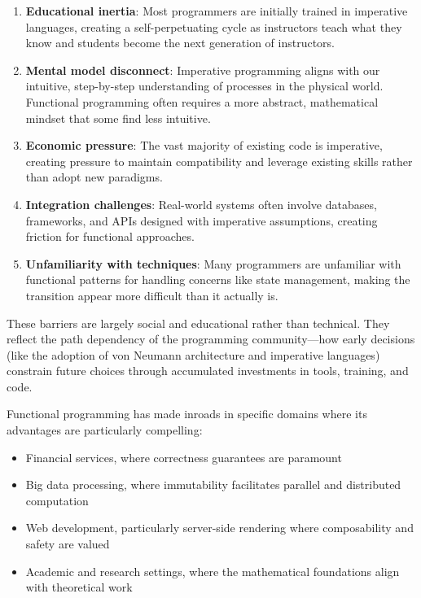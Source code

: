 \documentclass[11pt]{article}
\begin{document}
\begin{enumerate}
\item \textbf{Educational inertia}: Most programmers are initially trained in imperative languages, creating a self-perpetuating cycle as instructors teach what they know and students become the next generation of instructors.

\item \textbf{Mental model disconnect}: Imperative programming aligns with our intuitive, step-by-step understanding of processes in the physical world. Functional programming often requires a more abstract, mathematical mindset that some find less intuitive.

\item \textbf{Economic pressure}: The vast majority of existing code is imperative, creating pressure to maintain compatibility and leverage existing skills rather than adopt new paradigms.

\item \textbf{Integration challenges}: Real-world systems often involve databases, frameworks, and APIs designed with imperative assumptions, creating friction for functional approaches.

\item \textbf{Unfamiliarity with techniques}: Many programmers are unfamiliar with functional patterns for handling concerns like state management, making the transition appear more difficult than it actually is.
\end{enumerate}

These barriers are largely social and educational rather than technical. They reflect the path dependency of the programming community—how early decisions (like the adoption of von Neumann architecture and imperative languages) constrain future choices through accumulated investments in tools, training, and code.

Functional programming has made inroads in specific domains where its advantages are particularly compelling:

\begin{itemize}
\item Financial services, where correctness guarantees are paramount
\item Big data processing, where immutability facilitates parallel and distributed computation
\item Web development, particularly server-side rendering where composability and safety are valued
\item Academic and research settings, where the mathematical foundations align with theoretical work
\end{itemize}
\end{document}

